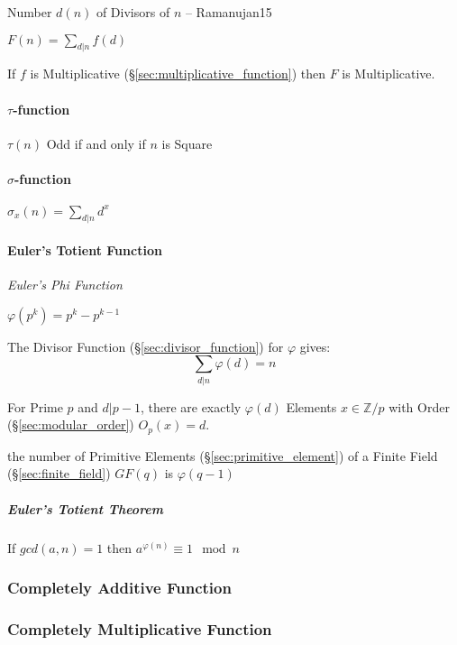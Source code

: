 Number $d(n)$ of Divisors of $n$ -- Ramanujan15

$F(n) = \sum_{d|n}f(d)$

If $f$ is Multiplicative (\S\ref{sec:multiplicative_function}) then
$F$ is Multiplicative.



\paragraph{$\tau$-function}\label{sec:tau_function}\hfill

$\tau(n)$ Odd if and only if $n$ is Square



\paragraph{$\sigma$-function}\label{sec:sigma_function}\hfill

$\sigma_x(n) = \sum_{d | n} d^x$



\paragraph{Euler's Totient Function}\label{sec:eulers_totient}\hfill

\emph{Euler's Phi Function}

$\varphi(p^k) = p^k - p^{k-1}$

The Divisor Function (\S\ref{sec:divisor_function}) for $\varphi$
gives:
\[
  \sum_{d|n}\varphi(d) = n
\]

For Prime $p$ and $d|p-1$, there are exactly $\varphi(d)$ Elements $x
\in \mathbb{Z}/p$ with Order (\S\ref{sec:modular_order}) $O_p(x) = d$.

the number of Primitive Elements (\S\ref{sec:primitive_element}) of a Finite
Field (\S\ref{sec:finite_field}) $GF(q)$ is $\varphi(q - 1)$



\subparagraph{Euler's Totient Theorem}\label{sec:totient_theorem}\hfill

If $gcd(a,n) = 1$ then $a^{\varphi(n)} \equiv 1 \mod n$



\subsubsection{Completely Additive Function}
\label{sec:completely_additive_function}

\subsubsection{Completely Multiplicative Function}
\label{sec:completely_multiplicative_function}

